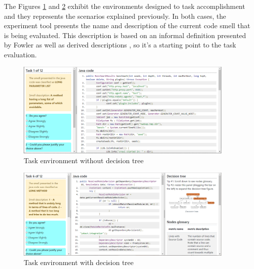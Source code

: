 The Figures \ref{fig:taskEnvironmentNoDT} and \ref{fig:taskEnvironmentDT} exhibit the environments designed to task accomplishment and they represents the scenarios explained previously. In both cases, the experiment tool presents the name and description of the current code smell that is being evaluated. This description is based on an informal definition presented by Fowler \cite{fowler1999refactoring} as well as derived descriptions \cite{hozano2018you, palomba2014they}, so it's a starting point to the task evaluation.

\begin{figure}[t]
\centering
\includegraphics[width=400px]{figures/task_enviroment_noDT.PNG}
        \caption{Task environment without decision tree}
        \label{fig:taskEnvironmentNoDT}
\end{figure}

\begin{figure}[t]
\centering
        \includegraphics[width=400px]{figures/task_enviroment.PNG}
        \caption{Task environment with decision tree}
        \label{fig:taskEnvironmentDT}
    \end{figure}  


